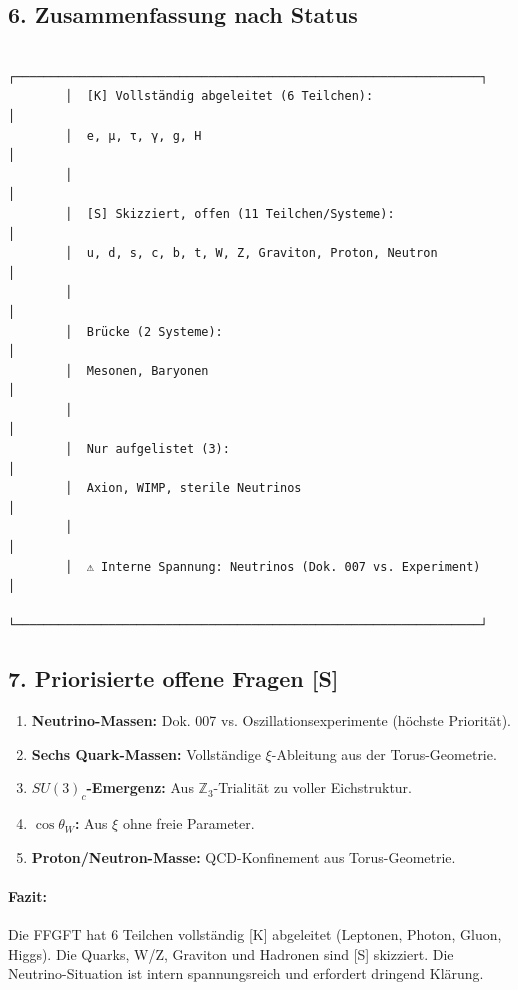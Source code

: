 \documentclass[11pt,a4paper]{article}
\begin{document}
	\subsection{6. Zusammenfassung nach Status}
	\begin{verbatim}
		┌─────────────────────────────────────────────────────────────────┐
		│  [K] Vollständig abgeleitet (6 Teilchen):                      │
		│  e, μ, τ, γ, g, H                                             │
		│                                                                 │
		│  [S] Skizziert, offen (11 Teilchen/Systeme):                   │
		│  u, d, s, c, b, t, W, Z, Graviton, Proton, Neutron            │
		│                                                                 │
		│  Brücke (2 Systeme):                                           │
		│  Mesonen, Baryonen                                             │
		│                                                                 │
		│  Nur aufgelistet (3):                                          │
		│  Axion, WIMP, sterile Neutrinos                                │
		│                                                                 │
		│  ⚠️ Interne Spannung: Neutrinos (Dok. 007 vs. Experiment)      │
		└─────────────────────────────────────────────────────────────────┘
	\end{verbatim}
	
	\subsection{7. Priorisierte offene Fragen [S]}
	\begin{enumerate}
		\item \textbf{Neutrino-Massen:} Dok. 007 vs. Oszillationsexperimente (höchste Priorität).
		\item \textbf{Sechs Quark-Massen:} Vollständige $\xi$-Ableitung aus der Torus-Geometrie.
		\item \textbf{\texorpdfstring{$SU(3)_c$}{SU(3)\_c}-Emergenz:} Aus $\mathbb{Z}_3$-Trialität zu voller Eichstruktur.
		\item \textbf{\texorpdfstring{$\cos\theta_W$}{cos theta\_W}:} Aus $\xi$ ohne freie Parameter.
		\item \textbf{Proton/Neutron-Masse:} QCD-Konfinement aus Torus-Geometrie.
	\end{enumerate}
	
	\paragraph{Fazit:} Die FFGFT hat 6 Teilchen vollständig [K] abgeleitet (Leptonen, Photon, Gluon, Higgs). Die Quarks, W/Z, Graviton und Hadronen sind [S] skizziert. Die Neutrino-Situation ist intern spannungsreich und erfordert dringend Klärung.
	
\end{document}
